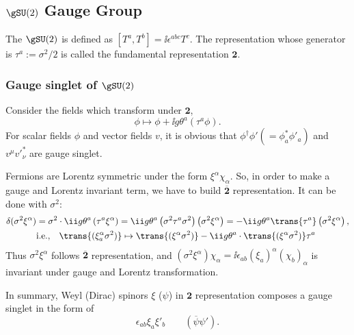 \subsection{$\gSU(2)$ Gauge Group}
The $\gSU(2)$ is defined as $[T^a,T^b]=\ii\epsilon^{abc}T^c$.
The representation whose generator is $\tau^a:=\sigma^2/2$ is called the fundamental representation $\boldsymbol 2$.
\subsubsection{Gauge singlet of $\gSU(2)$}
Consider the fields which transform under $\boldsymbol2$,
\begin{equation}
 \phi\mapsto \phi+\ii g\theta^a\left(\tau^a\phi\right).
\end{equation}
For scalar fields $\phi$ and vector fields $v$, it is obvious that $\phi^\dagger\phi' (=\phi^*_a \phi'_a)$ and $v^\mu v'^*_\nu$ are gauge singlet.

Fermions are Lorentz symmetric under the form
 $\xi^\alpha\chi_\alpha$.
So, in order to make a gauge and Lorentz invariant term, we have to build $\overline{\boldsymbol 2}$ representation. It can be done with $\sigma^2$:
\begin{equation}\begin{split}
  \delta(\sigma^2\xi^\alpha) &=
\sigma^2\cdot\ii g\theta^a\left(\tau^a\xi^\alpha\right)
=
\ii g\theta^a\left(\sigma^2\tau^a\sigma^2\right)\left(\sigma^2\xi^\alpha\right)
=
-\ii g\theta^a\trans{\tau^a}\left(\sigma^2\xi^\alpha\right)
,\\
& \text{i.e.,}\quad \trans{(\xi^\alpha_a\sigma^2)}\mapsto\trans{(\xi^\alpha\sigma^2)}-\ii g\theta^a\cdot\trans{(\xi^\alpha\sigma^2)}\tau^a
\end{split}\end{equation}
Thus $\sigma^2\xi^\alpha$ follows $\overline{\boldsymbol 2}$ representation, and
$(\sigma^2\xi^\alpha)\chi_\alpha=\ii\epsilon_{ab}(\xi_a)^\alpha(\chi_b)_\alpha$ is invariant under gauge and Lorentz transformation.


In summary, Weyl (Dirac) spinors $\xi$ ($\psi$) in ${\boldsymbol 2}$ representation composes a gauge singlet in the form of
\begin{equation}
 \epsilon_{ab}\xi_a\xi'_b \qquad (\overline\psi \psi').
\end{equation}

